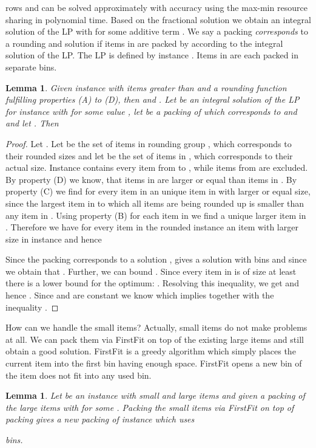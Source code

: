 \documentclass[a4paper,11pt]{article}
\newtheorem{lem}[thm]{Lemma}
\begin{document}
rows
and can be solved approximately with accuracy  using the max-min resource sharing \cite{grigoriadis2001approximate}
in polynomial time.
Based on the fractional solution we obtain an integral solution  of the LP with 
for some additive term .
We say a packing  \emph{corresponds} to a rounding  and solution  if items 
in  are packed by  according to the integral solution  of the LP. The LP is defined by
instance . Items in  are each packed in separate bins.
\begin{lem}\label{lem10}
  Given instance  with items greater than  and a rounding function  fulfilling properties
  (A) to (D), then  and .
  Let  be an integral solution of the LP for instance  with  
  for some value , let  be a packing of  which corresponds to  and  and let  
  . Then
  
\end{lem}
\begin{proof}
	Let . Let  be the set of items in rounding group , which corresponds
	to their rounded sizes and let  be the set of items in , which corresponds to their actual
	size. Instance  contains every item from  to , 
	while items from  are excluded.
	By property (D) we know, that items in  are larger or equal than items in .
	By property (C) we find for every item in  an unique item in  with larger or equal size, 
	since the largest item
	in  to which all items are being rounded up is smaller than any item in .
	Using property (B) for each item in  we find a unique larger item in .
	Therefore we have for every item in the rounded instance  an item with larger size in instance  and hence
	
   Since the packing  corresponds to a solution ,  gives a solution with 
    bins and since 
   we obtain that . Further, we can bound .
   Since every item in  is of size at least  there is a lower bound for the optimum:
   .
   Resolving this inequality, we get  and hence 
	. Since
    and  are constant we know  which implies together with
   the inequality .
\end{proof}
How can we handle the small items? Actually, small items do not make problems at all. We can pack them via 
FirstFit \cite{coffman1984approximation}
on top of the existing large items and still obtain a good solution. FirstFit is a greedy algorithm which simply places
the current item into the first bin having enough space. FirstFit opens a new bin of the item does not fit into any
used bin.
\begin{lem}\label{lem11} \cite{de1981bin}
	Let  be an instance with small and large items and given a packing  of the large items with
	 for some .
  Packing the small items via FirstFit on top of packing  gives a new packing of instance  which uses
  
  bins.
\end{lem}
\end{document}
